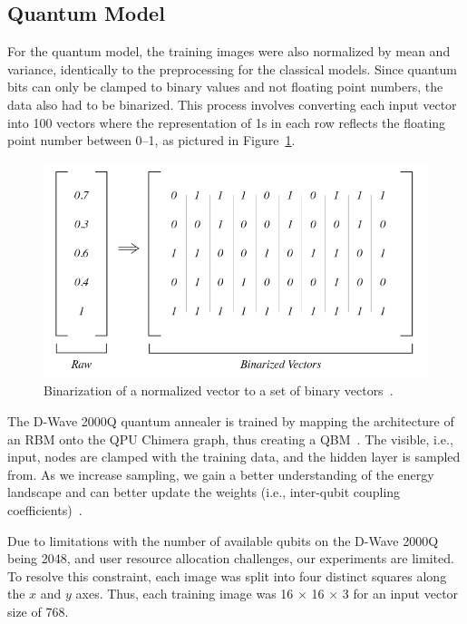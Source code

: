 \documentclass[technologies,article,accept,pdftex,moreauthors]{Definitions/mdpi}
\begin{document}
\subsection{Quantum Model}
\label{binarize}
For the quantum model, the training images were also normalized by mean and variance, identically to the preprocessing for the classical models. Since quantum bits can only be clamped to binary values and not floating point numbers, the data also had to be binarized. This process involves converting each input vector into 100 vectors where the representation of 1s in each row reflects the floating point number between 0--1, as pictured in Figure~\ref{fig: binarize}.

\begin{figure}[H]
    \includegraphics[width=0.99\columnwidth]{binarize.png}
    \caption{\label{fig: binarize} Binarization of a normalized vector to a set of binary vectors~\cite{Jain2020}.}
\end{figure}


The D-Wave 2000Q quantum annealer is trained by mapping the architecture of an RBM onto the QPU Chimera graph, thus creating a QBM~\cite{dwavedocs}. The visible, i.e., input, nodes are clamped with the training data, and the hidden layer is sampled from. As we increase sampling, we gain a better understanding of the energy landscape and can better update the weights (i.e., inter-qubit coupling coefficients)~\cite{Jain2020}.


Due to limitations with the number of available qubits on the D-Wave 2000Q being 2048, and user resource allocation challenges, our experiments are limited. To resolve this constraint, each image was split into four distinct squares along the $x$ and $y$ axes. Thus, each training image was 16 $\times$ 16 $\times$ 3 for an input vector size of 768.
\end{document}
